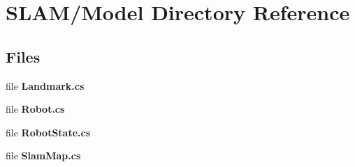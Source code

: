 \section{S\-L\-A\-M/\-Model Directory Reference}
\label{dir_b763099525af87bd29bd77a8dc866d6d}
\subsection*{Files}
\begin{DoxyCompactItemize}
\item 
file {\bf Landmark.\-cs}
\item 
file {\bf Robot.\-cs}
\item 
file {\bf Robot\-State.\-cs}
\item 
file {\bf Slam\-Map.\-cs}
\end{DoxyCompactItemize}
